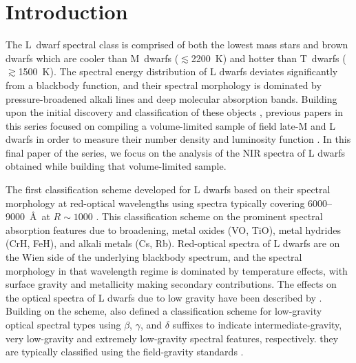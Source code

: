 \documentclass[modern,trackchanges]{aastex61}
\begin{document}
\section{Introduction}
The L~dwarf spectral class is comprised of both the lowest mass stars and brown dwarfs which are cooler than M~dwarfs ($\lesssim$2200~K) and hotter than T~dwarfs ($\gtrsim$1500~K).
The spectral energy distribution of L dwarfs deviates significantly from a blackbody function, and their spectral morphology is dominated by pressure-broadened alkali lines and deep molecular absorption bands.
Building upon the initial discovery and classification of these objects \citep{Becklin88_GD165B,K99,Martin99,Kirkpatrick05}, previous papers in this series focused on compiling a volume-limited sample of field late-M and L dwarfs in order to measure their number density and luminosity function \citep[Papers V, IX, and X]{Cruz03,Cruz07,Reid08}.
In this final paper of the series, we focus on the analysis of the NIR spectra of L dwarfs obtained while building that volume-limited sample.

The first classification scheme developed for L dwarfs  based on their spectral morphology at red-optical wavelengths using spectra typically covering 6000--9000~\AA~at $R\sim1000$ \citep{Martin99,K99,Kirkpatrick05}.
This classification scheme  on the prominent spectral absorption features due to  broadening, metal oxides (VO, TiO), metal hydrides (CrH, FeH), and alkali metals (Cs, Rb).
Red-optical spectra of L dwarfs are on the Wien side of the underlying blackbody spectrum, and the spectral morphology in that wavelength regime is dominated by temperature effects, with surface gravity and metallicity making secondary contributions.
The effects on the optical spectra of L dwarfs due to low gravity have been described by \citet{Martin99,Kirkpatrick06,Kirkpatrick08, Cruz09_lowg,Luhman09_taurus}.
Building on the \citet{K99} scheme, \citet{Cruz09_lowg} also defined a classification scheme for low-gravity optical spectral types using $\beta$, $\gamma$, and $\delta$ suffixes to indicate intermediate-gravity, very low-gravity and extremely low-gravity spectral features, respectively.
 they are typically classified using the field-gravity standards \citep{Gizis:2006jl,Burgasser07_subdwarfs, Burgasser08_blue, Kirkpatrick10, Kirkpatrick:2014kv}.
\end{document}
